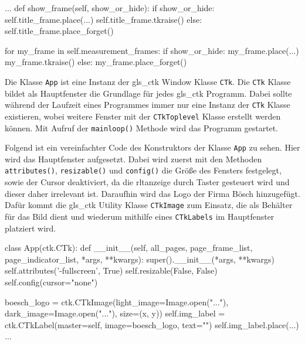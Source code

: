 \begin{pythoncode}
...
	def show_frame(self, show_or_hide):
		if show_or_hide:
			self.title_frame.place(...)
			self.title_frame.tkraise()
		else:
			self.title_frame.place_forget()
		
		for my_frame in self.measurement_frames:
			if show_or_hide:
				my_frame.place(...)
				my_frame.tkraise()
			else:
				my_frame.place_forget()
\end{pythoncode}

Die Klasse \lstinline{App} ist eine Instanz der \gls{gls_ctk} Window Klasse \lstinline{CTk}. Die \lstinline{CTk} Klasse bildet als Hauptfenster die Grundlage für jedes \gls{gls_ctk} Programm. Dabei sollte während der Laufzeit eines Programmes immer nur eine Instanz der \lstinline{CTk} Klasse existieren, wobei weitere Fenster mit der \lstinline{CTkToplevel} Klasse erstellt werden können. Mit Aufruf der \lstinline{mainloop()} Methode wird das Programm gestartet.
\cite[vgl.][]{Schimansky:o.J.} 

Folgend ist ein vereinfachter Code des Konstruktors der Klasse \lstinline{App} zu sehen. Hier wird das Hauptfenster aufgesetzt. Dabei wird zuerst mit den Methoden \lstinline{attributes()}, \lstinline{resizable()} und \lstinline{config()} die Größe des Fensters festgelegt, sowie der Cursor deaktiviert, da die \acs{rltanzeige} durch Taster gesteuert wird und dieser daher irrelevant ist. Daraufhin wird das Logo der Firma Bösch hinzugefügt. Dafür kommt die \gls{gls_ctk} Utility Klasse \lstinline{CTkImage} zum Einsatz, die als Behälter für das Bild dient und wiederum mithilfe eines \lstinline{CTkLabels} im Hauptfenster platziert wird.

\begin{pythoncode}
class App(ctk.CTk):
	def __init__(self, all_pages, page_frame_list, page_indicator_list, *args, **kwargs):
		super().__init__(*args, **kwargs)
		self.attributes('-fullscreen', True)
		self.resizable(False, False)
		self.config(cursor="none")
		
		boesch_logo = ctk.CTkImage(light_image=Image.open("..."), dark_image=Image.open("..."), size=(x, y))
		self.img_label = ctk.CTkLabel(master=self, image=boesch_logo, text="")
		self.img_label.place(...)
...
\end{pythoncode}


